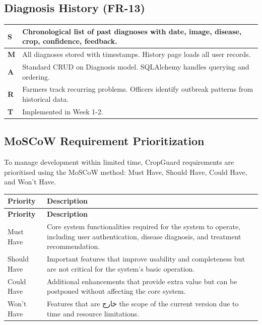 \documentclass[12pt,a4paper]{article}
\begin{document}
\subsection{Diagnosis History (FR-13)}
\begin{tabularx}{\textwidth}{|l|X|}
\hline
\rowcolor{lightgreen}
\textbf{S} & Chronological list of past diagnoses with date, image, disease, crop, confidence, feedback. \\
\hline
\textbf{M} & All diagnoses stored with timestamps. History page loads all user records. \\
\hline
\textbf{A} & Standard CRUD on Diagnosis model. SQLAlchemy handles querying and ordering. \\
\hline
\textbf{R} & Farmers track recurring problems. Officers identify outbreak patterns from historical data. \\
\hline
\textbf{T} & Implemented in Week 1-2. \\
\hline
\end{tabularx}

\renewcommand{\arraystretch}{1.0}

\subsection{MoSCoW Requirement Prioritization}

To manage development within limited time, CropGuard requirements are prioritised using the MoSCoW method: Must Have, Should Have, Could Have, and Won’t Have.

\begin{longtable}{|p{3cm}|p{10cm}|}
\hline
\rowcolor{lightgreen}
\textbf{Priority} & \textbf{Description} \\
\hline
\endfirsthead

\hline
\rowcolor{lightgreen}
\textbf{Priority} & \textbf{Description} \\
\hline
\endhead

Must Have &
Core system functionalities required for the system to operate, including user authentication, disease diagnosis, and treatment recommendation. \\
\hline

Should Have &
Important features that improve usability and completeness but are not critical for the system’s basic operation. \\
\hline

Could Have &
Additional enhancements that provide extra value but can be postponed without affecting the core system. \\
\hline

Won’t Have &
Features that are خارج the scope of the current version due to time and resource limitations. \\
\hline

\end{longtable}
\end{document}
